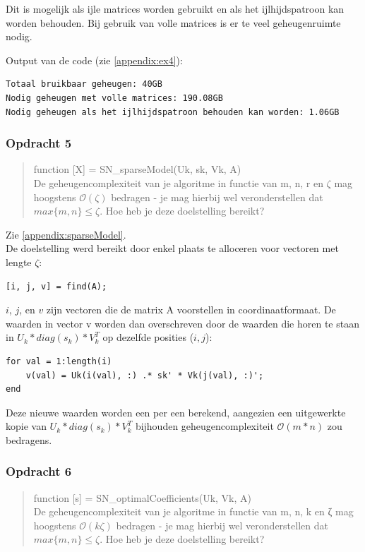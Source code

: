 \documentclass[11pt, a4paper, titlepage, openright]{article}
\begin{document}
    Dit is mogelijk als ijle matrices worden gebruikt en als het ijlhijdspatroon kan worden behouden.
    Bij gebruik van volle matrices is er te veel geheugenruimte nodig.

	Output van de code (zie \ref{appendix:ex4}):
\begin{lstlisting}
Totaal bruikbaar geheugen: 40GB
Nodig geheugen met volle matrices: 190.08GB
Nodig geheugen als het ijlhijdspatroon behouden kan worden: 1.06GB
\end{lstlisting}

	\subsubsection{Opdracht 5}
    \begin{quote}
        function [X] = SN\_sparseModel(Uk, sk, Vk, A) \\
        De geheugencomplexiteit van je algoritme in functie van m, n, r en \(\zeta\) mag hoogstens \(\mathcal{O}(\zeta)\) bedragen
        - je mag hierbij wel veronderstellen dat \( max\{m, n\} \leq \zeta \). Hoe heb je deze doelstelling bereikt?
    \end{quote}

    Zie \ref{appendix:sparseModel}. \\
    De doelstelling werd bereikt door enkel plaats te alloceren voor vectoren met lengte \( \zeta \):
\begin{lstlisting}[style=Matlab-editor, basicstyle = \scriptsize]
[i, j, v] = find(A);
\end{lstlisting}
     \(i\), \(j\), en \(v\) zijn vectoren
    die de matrix A voorstellen in coordinaatformaat. De waarden in vector v worden dan overschreven door de waarden die horen te staan in
    \( U_k * diag(s_k) * V_k^T \) op dezelfde posities (\(i, j\)):
\begin{lstlisting}[style=Matlab-editor, basicstyle = \scriptsize]
for val = 1:length(i)
    v(val) = Uk(i(val), :) .* sk' * Vk(j(val), :)';
end
\end{lstlisting}
    Deze nieuwe waarden worden een per een berekend, aangezien een uitgewerkte kopie van
    \( U_k * diag(s_k) * V_k^T \) bijhouden geheugencomplexiteit \(\mathcal{O}(m*n)\) zou bedragens.

	\subsubsection{Opdracht 6}
    \begin{quote}
        function [s] = SN\_optimalCoefficients(Uk, Vk, A) \\
        De geheugencomplexiteit van je algoritme in functie van m, n, k en ζ mag hoogstens \(\mathcal{O}(k\zeta)\) bedragen
        - je mag hierbij wel veronderstellen dat \( max\{m, n\} \leq \zeta \). Hoe heb je deze doelstelling bereikt?
    \end{quote}
\end{document}
